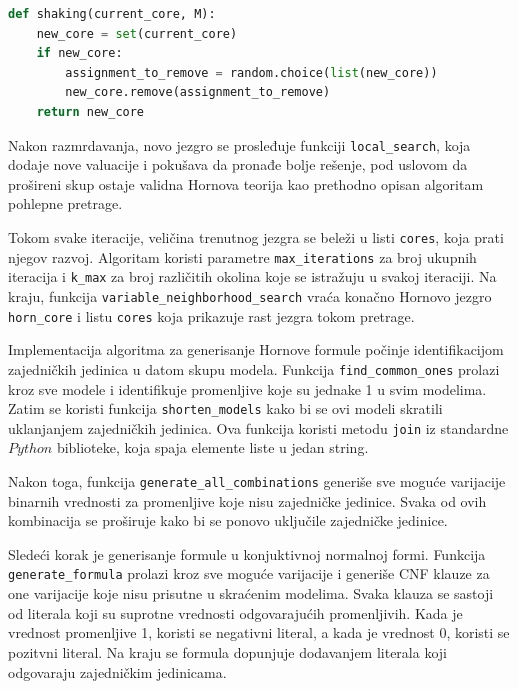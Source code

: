 \documentclass[12pt,oneside]{memoir}
\begin{document}
\begin{lstlisting}[language=Python]
def shaking(current_core, M):
    new_core = set(current_core)
    if new_core:
        assignment_to_remove = random.choice(list(new_core))
        new_core.remove(assignment_to_remove)
    return new_core
\end{lstlisting}
\vspace{0.5cm}

Nakon razmrdavanja, novo jezgro se prosleđuje funkciji \texttt{local\_search}, koja dodaje nove valuacije i pokušava da pronađe bolje rešenje, pod uslovom da prošireni skup ostaje validna Hornova teorija kao prethodno opisan algoritam pohlepne pretrage.

Tokom svake iteracije, veličina trenutnog jezgra se beleži u listi \texttt{cores}, koja prati njegov razvoj. Algoritam koristi parametre \texttt{max\_iterations} za broj ukupnih iteracija i \texttt{k\_max} za broj različitih okolina koje se istražuju u svakoj iteraciji. Na kraju, funkcija \texttt{variable\_neighborhood\_search} vraća konačno Hornovo jezgro \texttt{horn\_core} i listu \texttt{cores} koja prikazuje rast jezgra tokom pretrage.

Implementacija algoritma za generisanje Hornove formule počinje identifikacijom zajedničkih jedinica u datom skupu modela. Funkcija \texttt{find\_common\_ones} prolazi kroz sve modele i identifikuje promenljive koje su jednake 1 u svim modelima. Zatim se koristi funkcija \texttt{shorten\_models} kako bi se ovi modeli skratili uklanjanjem zajedničkih jedinica. Ova funkcija koristi metodu \texttt{join} iz standardne $Python$ biblioteke, koja spaja elemente liste u jedan string.

Nakon toga, funkcija \texttt{generate\_all\_combinations} generiše sve moguće varijacije binarnih vrednosti za promenljive koje nisu zajedničke jedinice. Svaka od ovih kombinacija se proširuje kako bi se ponovo uključile zajedničke jedinice.

Sledeći korak je generisanje formule u konjuktivnoj normalnoj formi. Funkcija \texttt{generate\_formula} prolazi kroz sve moguće varijacije i generiše CNF klauze za one varijacije koje nisu prisutne u skraćenim modelima. Svaka klauza se sastoji od literala koji su suprotne vrednosti odgovarajućih promenljivih. Kada je vrednost promenljive 1, koristi se negativni literal, a kada je vrednost 0, koristi se pozitvni literal. Na kraju se formula dopunjuje dodavanjem literala koji odgovaraju zajedničkim jedinicama.
\end{document}
